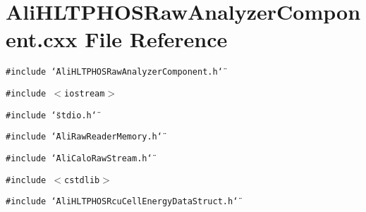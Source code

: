 \section{Ali\-HLTPHOSRaw\-Analyzer\-Component.cxx File Reference}
\label{AliHLTPHOSRawAnalyzerComponent_8cxx}


{\tt \#include \char`\"{}Ali\-HLTPHOSRaw\-Analyzer\-Component.h\char`\"{}}\par
{\tt \#include $<$iostream$>$}\par
{\tt \#include \char`\"{}stdio.h\char`\"{}}\par
{\tt \#include \char`\"{}Ali\-Raw\-Reader\-Memory.h\char`\"{}}\par
{\tt \#include \char`\"{}Ali\-Calo\-Raw\-Stream.h\char`\"{}}\par
{\tt \#include $<$cstdlib$>$}\par
{\tt \#include \char`\"{}Ali\-HLTPHOSRcu\-Cell\-Energy\-Data\-Struct.h\char`\"{}}\par

